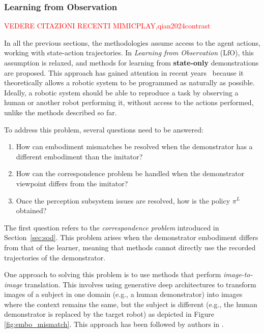 \subsubsection{Learning from Observation}
\textcolor{red}{VEDERE CITAZIONI RECENTI MIMICPLAY,qian2024contrast}


\label{sec:lfo}
In all the previous sections, the methodologies assume access to the agent actions, working with state-action trajectories. In \textit{Learning from Observation} (LfO), this assumption is relaxed, and methods for learning from \textbf{state-only} demonstrations are proposed. This approach has gained attention in recent years~\cite{torabi2019recent_advances_lfo} because it theoretically allows a robotic system to be programmed as naturally as possible. Ideally, a robotic system should be able to reproduce a task by observing a human or another robot performing it, without access to the actions performed, unlike the methods described so far.

To address this problem, several questions need to be answered:

\begin{enumerate}
\item How can embodiment mismatches be resolved when the demonstrator has a different embodiment than the imitator?
\item How can the correspondence problem be handled when the demonstrator viewpoint differs from the imitator?
\item Once the perception subsystem issues are resolved, how is the policy $\pi^{L}$ obtained?
\end{enumerate}

The first question refers to the \textit{correspondence problem} introduced in Section~\ref{sec:sod}. This problem arises when the demonstrator embodiment differs from that of the learner, meaning that methods cannot directly use the recorded trajectories of the demonstrator.

One approach to solving this problem is to use methods that perform \textit{image-to-image} translation. This involves using generative deep architectures to transform images of a subject in one domain (e.g., a human demonstrator) into images where the context remains the same, but the subject is different (e.g., the human demonstrator is replaced by the target robot) as depicted in Figure \ref{fig:embo_mismatch}. This approach has been followed by authors in \cite{smith2019avid,xiong2021learning_by_watching,li2021meta_watching_video_demonstration}.

